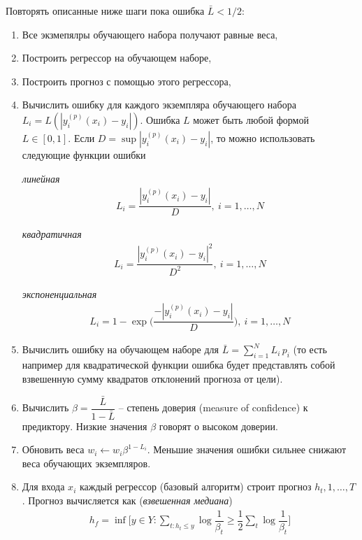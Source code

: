 \documentclass[%
	11pt,
	a4paper,
	utf8,
		]{article}
\begin{document}
Повторять описанные ниже шаги пока ошибка $ \bar{L} < 1/2 $:
\begin{enumerate}
	\item Все экзмепялры обучающего набора получают равные веса,
	
	\item Построить регрессор на обучающем наборе,
	
	\item Построить прогноз с помощью этого регрессора,
	
	\item Вычислить ошибку для каждого экземпляра обучающего набора $ L_i = L( |y_i^{(p)}(x_i) - y_i| ) $. Ошибка $ L $ может быть любой формой $ L \in [0, 1] $. Если $ D = \sup | y_i^{(p)}(x_i) - y_i | $, то можно использовать следующие функции ошибки
	
\emph{линейная}
\begin{align*}
	L_i = \dfrac{ | y_i^{(p)}(x_i) - y_i |}{D}, \ i = 1, \ldots, N
\end{align*}

\emph{квадратичная}
\begin{align*}
	L_i = \dfrac{ | y_i^{(p)}(x_i) - y_i |^2 }{D^2}, \ i = 1, \ldots, N
\end{align*}

\emph{экспоненциальная}
\begin{align*}
	L_i = 1 - \exp\Big( \dfrac{ - | y_i^{(p)}(x_i) - y_i | }{D} \Big), \ i = 1, \ldots, N
\end{align*}
    \item Вычислить ошибку на обучающем наборе для $ \bar{L} = \sum_{i=1}^{N} L_i \, p_i $ (то есть например для квадратической функции ошибка будет представлять собой взвешенную сумму квадратов отклонений прогноза от цели).
    
    \item Вычислить $ \beta = \dfrac{\bar{L}}{1 - \bar{L}} $ -- степень доверия (measure of confidence) к предиктору. Низкие значения $ \beta $ говорят о высоком доверии.
    
    \item Обновить веса $ w_i \leftarrow w_i \beta^{ 1 - L_i } $. Меньшие значения ошибки сильнее снижают веса обучающих экземпляров.
    
    \item Для входа $ x_i $ каждый регрессор (базовый алгоритм) строит прогноз $ h_t, 1, \ldots, T $. Прогноз вычисляется как (\emph{взвешенная медиана})
\begin{align*}
	h_f = \inf \Big[ y \in Y: \sum_{t: h_t \leqslant y} \log \dfrac{1}{\beta_t} \geqslant \dfrac{1}{2} \sum_{t}  \log \dfrac{1}{\beta_t} \Big]
\end{align*}
\end{enumerate}
\end{document}
